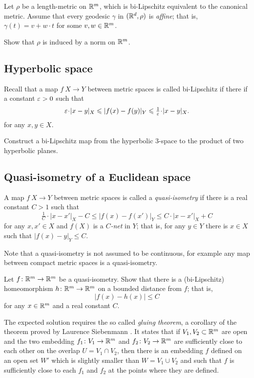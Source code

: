 \begin{pr}
Let $\rho$ be a length-metric on $\mathbb{R}^m$, 
which is bi-Lipschitz equivalent to the canonical metric.
Assume that every geodesic $\gamma$ in $(\mathbb{R}^d,\rho)$ is \emph{affine};
that is, $\gamma(t)=v+w\cdot t$ for some $v,w\in\mathbb{R}^m$.

Show that $\rho$ is induced by a norm on $\mathbb{R}^m$.
\end{pr}

\subsection*{Hyperbolic space}
\label{Hyperbolic space}

Recall that a map $f\:X\to Y$ between metric spaces is called bi-Lipschitz if there if a constant $\varepsilon>0$
such that 
\[\eps\cdot|x-y|_X\le|f(x)-f(y)|_Y\le\tfrac1\eps\cdot|x-y|_X.\]
for any $x,y\in X$.


\begin{pr}
Construct a bi-Lipschitz map
from the hyperbolic $3$-space 
to the product of two hyperbolic planes.
\end{pr}

\subsection*{Quasi-isometry of a Euclidean space\thm}
\label{hom-near-QI} 

A map $f\:X\to Y$ between metric spaces is called a \emph{quasi-isometry} if there is a  real constant $C>1$ such that 
$$\tfrac{1}{C}\cdot|x-x'|_X-C
\le 
|f(x)-f(x')|_Y\le C\cdot|x-x'|_X+C$$
for any $x,x'\in X$ and $f(X)$ is a \emph{$C$-net} in $Y$;
that is, for any $y\in Y$ there is $x\in X$ such that $|f(x)-y|_Y\le C$.


Note that a quasi-isometry is not assumed to be continuous, for example any map between compact metric spaces is a quasi-isometry.

\begin{pr}
Let $f\colon\mathbb{R}^m\to\mathbb{R}^m$ be a quasi-isometry.
Show that there is a (bi-Lipschitz) homeomorphism 
$h\colon\mathbb{R}^m\to\mathbb{R}^m$ on a bounded distance from $f$;
that is, 
$$|f(x)-h(x)|\le C$$
for any $x\in\mathbb{R}^m$ and a real constant $C$.
\end{pr}

The expected solution requires the so called \emph{gluing theorem},
a corollary of the theorem proved by Laurence Siebenmann \cite[see][]{siebenmann}.
It states that 
if $V_1, V_2\subset\mathbb{R}^m$ are open
and the two embedding $f_1\colon V_1\to\mathbb{R}^m$ and $f_2\colon V_2\to\mathbb{R}^m$ 
are sufficiently close to each other 
on the overlap $U=V_1\cap V_2$, 
then
there is an embedding $f$ defined on an open set $W'$
which is slightly smaller than $W=V_1\cup V_2$
and such that $f$ is sufficiently close to each $f_1$ and $f_2$ at the points where they are defined.

